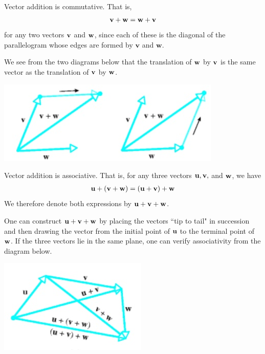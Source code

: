\documentclass[12pt,letterpaper,reqno]{article}
\numberwithin{equation}{section}
\begin{document}
\begin{prop}
	Vector addition is commutative. That is, 
	\begin{align*}
		{\bf v}+{\bf w}={\bf w}+{\bf v}
	\end{align*}
	for any two vectors ${\bf v}$ and ${\bf w}$, since each of these is the diagonal of the parallelogram whose edges are formed by $\mathbf{v}$ and $\mathbf{w}$.
\end{prop}

\begin{pf}
	We see from the two diagrams below that the translation of ${\bf w}$ by ${\bf v}$ is the same vector as the translation of ${\bf v}$ by ${\bf w}$.
\begin{center}
	\includegraphics[scale=0.5]{figures_mvc/equivalence_of_vector_addition}
\end{center}

\end{pf}

\begin{prop}
	Vector addition is associative. That is, for any three vectors ${\bf u}, {\bf v},$ and ${\bf w}$, we have
	\begin{align*}
		{\bf u}+({\bf v}+{\bf w})=({\bf u}+{\bf v})+{\bf w}
	\end{align*}
We therefore denote both expressions by ${\bf u}+{\bf v}+{\bf w}$. 
\end{prop}

\begin{pf}
One can construct ${\bf u}+{\bf v}+{\bf w}$ by placing the vectors ``tip to tail" in succession and then drawing the vector from the initial point of ${\bf u}$ to the terminal point of ${\bf w}$. If the three vectors lie in the same plane, one can verify associativity from the diagram below.
\end{pf}

\begin{center}
	\includegraphics[scale=0.5]{figures_mvc/associativity_of_vector_addition}
\end{center}
\end{document}
